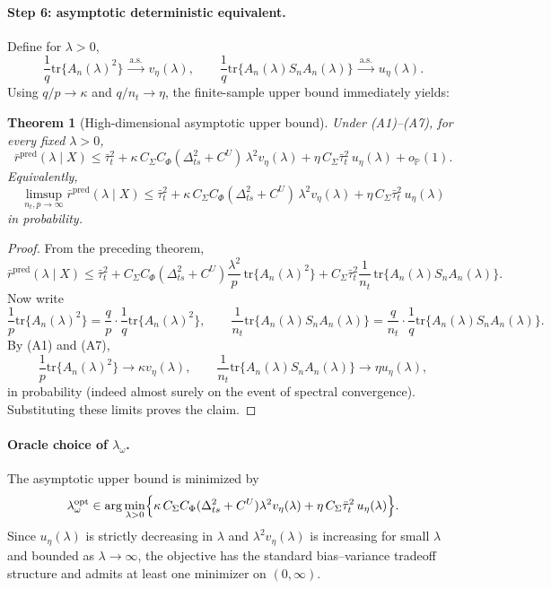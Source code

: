 \documentclass[11pt]{article}
\newcommand{\1}{\mathbf{1}}
\newtheorem{theorem}{Theorem}
\begin{document}
\bigskip

\paragraph{Step 6: asymptotic deterministic equivalent.}

Define for \(\lambda>0\),
\[
\frac1q\mathrm{tr}\{A_n(\lambda)^2\}\ \xrightarrow{\text{a.s.}}\ v_\eta(\lambda),
\qquad
\frac1q\mathrm{tr}\{A_n(\lambda)S_nA_n(\lambda)\}\ \xrightarrow{\text{a.s.}}\ u_\eta(\lambda).
\]
Using \(q/p\to\kappa\) and \(q/n_t\to\eta\), the finite-sample upper bound immediately yields:

\begin{theorem}[High-dimensional asymptotic upper bound]
Under (A1)--(A7), for every fixed \(\lambda>0\),
\[
\bar r^{\mathrm{pred}}(\lambda\mid X)
\le
\bar\tau_t^2
+
\kappa\,C_\Sigma C_\Phi(\Delta_{ts}^2+C^U)\,
\lambda^2 v_\eta(\lambda)
+
\eta\,C_\Sigma\bar\tau_t^2\,u_\eta(\lambda)
+
o_{\mathbb P}(1).
\]
Equivalently,
\[
\limsup_{n_t,p\to\infty}
\bar r^{\mathrm{pred}}(\lambda\mid X)
\le
\bar\tau_t^2
+
\kappa\,C_\Sigma C_\Phi(\Delta_{ts}^2+C^U)\,
\lambda^2 v_\eta(\lambda)
+
\eta\,C_\Sigma\bar\tau_t^2\,u_\eta(\lambda)
\]
in probability.
\end{theorem}

\begin{proof}
From the preceding theorem,
\[
\bar r^{\mathrm{pred}}(\lambda\mid X)
\le
\bar\tau_t^2
+
C_\Sigma C_\Phi(\Delta_{ts}^2+C^U)\frac{\lambda^2}{p}\,
\mathrm{tr}\{A_n(\lambda)^2\}
+
C_\Sigma\bar\tau_t^2\frac1{n_t}\,
\mathrm{tr}\{A_n(\lambda)S_nA_n(\lambda)\}.
\]
Now write
\[
\frac1p\mathrm{tr}\{A_n(\lambda)^2\}
=
\frac{q}{p}\cdot \frac1q\mathrm{tr}\{A_n(\lambda)^2\},
\qquad
\frac1{n_t}\mathrm{tr}\{A_n(\lambda)S_nA_n(\lambda)\}
=
\frac{q}{n_t}\cdot \frac1q\mathrm{tr}\{A_n(\lambda)S_nA_n(\lambda)\}.
\]
By (A1) and (A7),
\[
\frac1p\mathrm{tr}\{A_n(\lambda)^2\}
\to
\kappa v_\eta(\lambda),
\qquad
\frac1{n_t}\mathrm{tr}\{A_n(\lambda)S_nA_n(\lambda)\}
\to
\eta u_\eta(\lambda),
\]
in probability (indeed almost surely on the event of spectral convergence). Substituting these limits proves the claim.
\end{proof}

\bigskip

\paragraph{Oracle choice of \(\lambda_\omega\).}

The asymptotic upper bound is minimized by
\[
\lambda_\omega^{\mathrm{opt}}
\in
\arg\min_{\lambda>0}
\Bigl\{
\kappa\,C_\Sigma C_\Phi(\Delta_{ts}^2+C^U)\lambda^2 v_\eta(\lambda)
+
\eta\,C_\Sigma\bar\tau_t^2\,u_\eta(\lambda)
\Bigr\}.
\]
Since \(u_\eta(\lambda)\) is strictly decreasing in \(\lambda\) and
\(\lambda^2v_\eta(\lambda)\) is increasing for small \(\lambda\) and bounded as \(\lambda\to\infty\), the objective has the standard bias--variance tradeoff structure and admits at least one minimizer on \((0,\infty)\).
\end{document}
